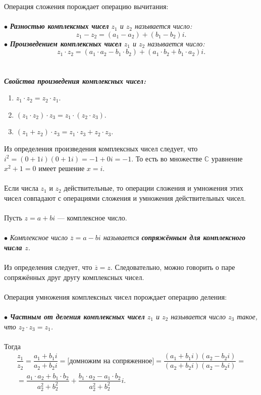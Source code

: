 Операция сложения порождает операцию вычитания:\\\\
$\bullet$ \textit{\textbf{Разностью комплексных чисел} $z_1$ и $z_2$ называется число: $$z_1 - z_2 = (a_1 - a_2) + (b_1 - b_2) i.$$ }
$\bullet$ \textit{\textbf{Произведением комплексных чисел} $z_1$ и $z_2$ называется число: $$z_1 \cdot z_2 = (a_1 \cdot a_2 - b_1 \cdot b_2) + (a_1 \cdot b_2 + b_1 \cdot a_2) i.$$ }\\\\
\textbf{\textit{Свойства произведения комплексных чисел:}}\begin{enumerate}
	\item $z_1\cdot z_2 = z_2\cdot z_1$.
	\item $(z_1\cdot z_2)\cdot z_3 = z_1\cdot (z_2\cdot z_3)$.
	\item $(z_1 + z_2)\cdot z_3 = z_1\cdot z_3 + z_2 \cdot z_3$.
\end{enumerate}
Из определения произведения комплексных чисел следует, что $i^2 = (0 + 1i)(0+1i) = -1 + 0i = -1$. То есть во множестве $\mathbb{C}$ уравнение $x^2 + 1 = 0$ имеет решение $x = i$.\\\\
Если числа $z_1$ и $z_2$ действительные, то операции сложения и умножения этих чисел совпадают с операциями сложения и умножения действительных чисел.\\\\
Пусть $z = a+ bi$ --- комплексное число.\\\\
$\bullet$ \textit{Комплексное число $\overline{z} = a - bi$ называется \textbf{сопряжённым для комплексного числа $z$}.}\\\\
Из определения следует, что $\overline{z} = z$. Следовательно, можно говорить о паре сопряжённых друг другу комплексных чисел.\\\\
Операция умножения комплексных чисел порождает операцию деления:\\\\
$\bullet$ \textit{\textbf{Частным от деления комплексных чисел} $z_1$ и $z_2$ называется число $z_3$ такое, что $z_2 \cdot z_3 = z_1$. }\\\\
Тогда \begin{multline*}
	\dfrac{z_1}{z_2} = \dfrac{a_1 + b_1 i}{a_2 + b_2 i} = \text{[домножим на сопряженное]} = \dfrac{(a_1 + b_1 i)(a_2 - b_2 i)}{(a_2 + b_2 i)(a_2 - b_2 i)}=\\= \dfrac{a_1\cdot a_2 + b_1 \cdot b_2}{a_2^2 + b_2 ^ 2} + \dfrac{b_1 \cdot a_2 - a_1 \cdot b_2}{a_2^2 + b_2^2}i.
\end{multline*}
